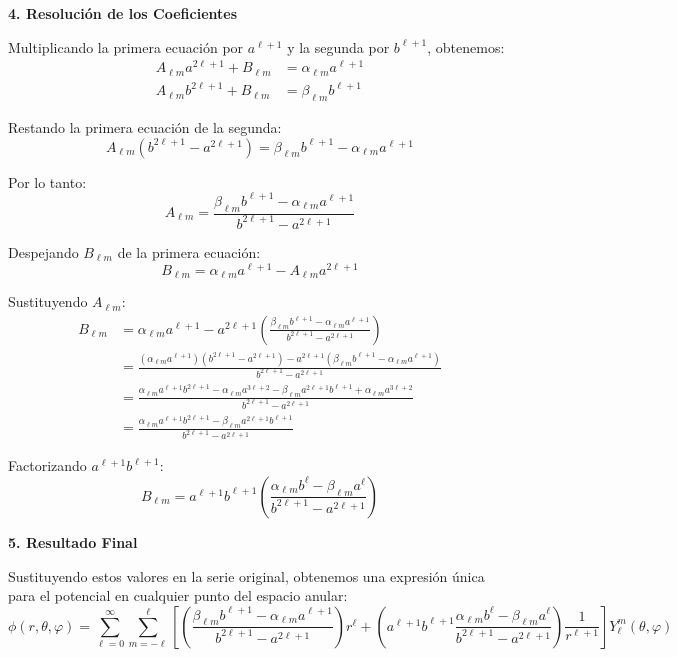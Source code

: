 \documentclass[a4paper]{article}
\begin{document}
\textbf{4. Resolución de los Coeficientes}

Multiplicando la primera ecuación por $a^{\ell+1}$ y la segunda por $b^{\ell+1}$, obtenemos:
\begin{align}
    A_{\ell m} a^{2\ell+1} + B_{\ell m} &= \alpha_{\ell m} a^{\ell+1} \\
    A_{\ell m} b^{2\ell+1} + B_{\ell m} &= \beta_{\ell m} b^{\ell+1}
\end{align}

Restando la primera ecuación de la segunda:
$$
A_{\ell m} (b^{2\ell+1} - a^{2\ell+1}) = \beta_{\ell m} b^{\ell+1} - \alpha_{\ell m} a^{\ell+1}
$$

Por lo tanto:
$$
A_{\ell m} = \frac{\beta_{\ell m} b^{\ell+1} - \alpha_{\ell m} a^{\ell+1}}{b^{2\ell+1} - a^{2\ell+1}}
$$

Despejando $B_{\ell m}$ de la primera ecuación:
$$
B_{\ell m} = \alpha_{\ell m} a^{\ell+1} - A_{\ell m} a^{2\ell+1}
$$

Sustituyendo $A_{\ell m}$:
\begin{align*}
B_{\ell m} &= \alpha_{\ell m} a^{\ell+1} - a^{2\ell+1} \left( \frac{\beta_{\ell m} b^{\ell+1} - \alpha_{\ell m} a^{\ell+1}}{b^{2\ell+1} - a^{2\ell+1}} \right) \\
&= \frac{(\alpha_{\ell m} a^{\ell+1})(b^{2\ell+1} - a^{2\ell+1}) - a^{2\ell+1}(\beta_{\ell m} b^{\ell+1} - \alpha_{\ell m} a^{\ell+1})}{b^{2\ell+1} - a^{2\ell+1}} \\
&= \frac{\alpha_{\ell m} a^{\ell+1} b^{2\ell+1} - \alpha_{\ell m} a^{3\ell+2} - \beta_{\ell m} a^{2\ell+1} b^{\ell+1} + \alpha_{\ell m} a^{3\ell+2}}{b^{2\ell+1} - a^{2\ell+1}} \\
&= \frac{\alpha_{\ell m} a^{\ell+1} b^{2\ell+1} - \beta_{\ell m} a^{2\ell+1} b^{\ell+1}}{b^{2\ell+1} - a^{2\ell+1}}
\end{align*}

Factorizando $a^{\ell+1} b^{\ell+1}$:
$$
B_{\ell m} = a^{\ell+1} b^{\ell+1} \left( \frac{\alpha_{\ell m} b^{\ell} - \beta_{\ell m} a^{\ell}}{b^{2\ell+1} - a^{2\ell+1}} \right)
$$

\textbf{5. Resultado Final}

Sustituyendo estos valores en la serie original, obtenemos una expresión única para el potencial en cualquier punto del espacio anular:
$$
\phi(r, \theta, \varphi) = \sum_{\ell=0}^\infty \sum_{m=-\ell}^\ell \left[ \left( \frac{\beta_{\ell m} b^{\ell+1} - \alpha_{\ell m} a^{\ell+1}}{b^{2\ell+1} - a^{2\ell+1}} \right) r^\ell + \left( a^{\ell+1} b^{\ell+1} \frac{\alpha_{\ell m} b^{\ell} - \beta_{\ell m} a^{\ell}}{b^{2\ell+1} - a^{2\ell+1}} \right) \frac{1}{r^{\ell+1}} \right] Y_\ell^m(\theta, \varphi)
$$
\end{document}
